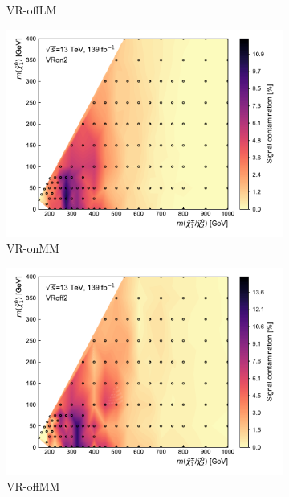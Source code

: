 \begin{figure}[H]
\begin{subfigure}[b]{0.5\linewidth}
		\caption{VR-offLM\label{fig:signal_contamination_VRoff1}}
	\end{subfigure}\hfill
	\begin{subfigure}[b]{0.5\linewidth}
		\centering\includegraphics[width=1.0\textwidth]{signal_contamination/plot_VRon2}
		\caption{VR-onMM\label{fig:signal_contamination_VRon2}}
	\end{subfigure}\hfill
	\begin{subfigure}[b]{0.5\linewidth}
		\centering\includegraphics[width=1.0\textwidth]{signal_contamination/plot_VRoff2}
		\caption{VR-offMM\label{fig:signal_contamination_VRoff2}}
	\end{subfigure}\hfill
	\begin{subfigure}[b]{0.5\linewidth}

\end{subfigure}
\end{figure}
